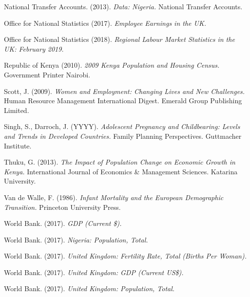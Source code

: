 \documentclass[11pt, english]{article}
\begin{document}
\begin{thebibliography}{9}
        	National Transfer Accounts. (2013).
                \textsl{Data: Nigeria.} 
		National Transfer Accounts.
	
                Office for National Statistics (2017).          
                \textsl{Employee Earnings in the UK.}

                Office for National Statistics (2018).
		\textsl{Regional Labour Market Statistics in the UK: February 2019.}
			
                Republic of Kenya (2010).
                \textsl{2009 Kenya Population and Housing Census.}
		Government Printer Nairobi.
	
                Scott, J. (2009).           
                \textsl{Women and Employment: Changing Lives and New Challenges.}
     		Human Resource Management International Digest. Emerald Group Publishing Limited. 
	
                Singh, S., Darroch, J. (YYYY).
		\textsl{Adolescent Pregnancy and Childbearing: Levels and Trends in Developed Countries.}
		Family Planning Perspectives. Guttmacher Institute.
			
        	Thuku, G. (2013).
                \textsl{The Impact of Population Change on Economic Growth in Kenya.}                       International Journal of Economics \& Management Sciences. Katarina University.
	
                Van de Walle, F. (1986).
                \textsl{Infant Mortality and the European Demographic Transition.}
      		Princeton University Press.

                World Bank. (2017).
		\textsl{GDP (Current \$).}
			
                World Bank. (2017).           
                \textsl{Nigeria: Population, Total.}
	
                World Bank. (2017).                  
                \textsl{United Kingdom: Fertility Rate, Total (Births Per Woman).}
	
                World Bank. (2017).                  
                \textsl{United Kingdom: GDP (Current US\$).}
      
                World Bank. (2017).                  
                \textsl{United Kingdom: Population, Total.}

	\end{thebibliography}
\end{document}
